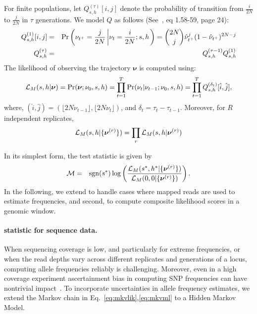 \documentclass[11pt]{article}
\def\comale{\text{COMALE }}
\begin{document}
For finite populations, let $Q^{(\tau)}_{s,h}[i,j]$ denote the
probability of transition from $\frac{i}{2N}$ to $\frac{j}{2N}$ in
$\tau$ generations. We model $Q$ as follows
(See~\cite{Ewens2012Mathematical}, eq 1.58-59, page 24):
\begin{eqnarray}
  Q^{(1)}_{s,h}[i,j] &=& \operatorname{Pr}\left(\nu_{t^+}=\frac{j}{2N} \left\lvert
      \nu_{t}=\frac{i}{2N};s,h \right .\right)={2N \choose j}
  \hat{\nu}_{t^+}^{j} (1-\hat{\nu}_{t^+})^{2N-j}\\
  Q^{(\tau)}_{s,h} &=& Q^{(\tau-1)}_{s,h}Q^{(1)}_{s,h}
  \label{eq:mkvs}   
\end{eqnarray}
The likelihood of observing the trajectory $\bm{\nu}$ is computed using:
\begin{equation}
  {\cal L}_{M}(s,h|\bm{\nu}) = \operatorname{Pr}(\bm{\nu};\nu_0,s,h)=
  \prod_{t=1}^{T} \operatorname{Pr}(\nu_{t}|\nu_{t-1};\nu_0,s,h) = \prod_{t=1}^{T} Q^{(\delta_t)}_{s,h}[\hat{i},\hat{j}],
\end{equation}
where, $(\hat{i},\hat{j})=(\lfloor 2N\nu_{t-1}\rfloor, \lfloor
2N\nu_{t}\rfloor)$, and $\delta_t=\tau_{t}-\tau_{t-1}$. Moreover, for $R$ independent replicates,
\begin{equation}
  {\cal L}_{M}(s,h|\{\bm{\nu}^{(r)}\}) = \prod_r   {\cal L}_{M}(s,h|\bm{\nu}^{(r)})
  \label{eq:mkvlik}
\end{equation}
In its simplest form, the \comale test statistic is given by
\begin{eqnarray}
{\cal M} &=& \operatorname{sgn}(s^*)\log 
\left(\frac{{\cal L}_M(s^*,h^*|\{\bm{\nu}^{(r)}\})}{{\cal L}_M(0,0|\{\bm{\nu}^{(r)}\})}\right).
\label{eq:mkvml}
\end{eqnarray}
In the following, we extend \comale to handle cases where mapped reads are
used to estimate frequencies, and second, to compute composite
likelihood scores in a genomic window.

\paragraph{\comale statistic for sequence data.} 
When sequencing coverage is low, and particularly for extreme
frequencies, or when the read depths vary across different replicates
and generations of a locus, computing allele frequencies reliably is
challenging. Moreover, even in a high coverage experiment
ascertainment bias in computing SNP frequencies can have nontrivial
impact~\cite{XXX}. To incorporate uncertainties in allele frequency
estimates, we extend the Markov chain in Eq.~\ref{eq:mkvlik},\ref{eq:mkvml}
to a Hidden Markov Model.
\end{document}
